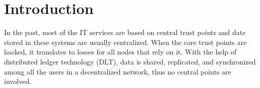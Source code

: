 \section{Introduction}
\label{sec:introduction}
In the past, most of the IT services are based on central trust points and date stored in these systems are usually centralized. 
When the core trust points are hacked, it translates to losses for all nodes that rely on it. 
With the help of distributed ledger technology (DLT), data is shared, replicated, and synchronized among all the users in a decentralized network, thus no central points are involved.